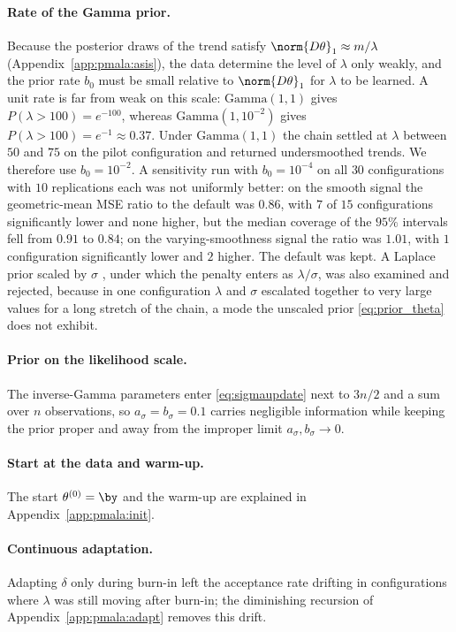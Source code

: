 \paragraph{Rate of the Gamma prior.} Because the posterior draws of the trend satisfy $\norm{D\theta}_1 \approx m/\lambda$ (Appendix~\ref{app:pmala:asis}), the data determine the level of $\lambda$ only weakly, and the prior rate $b_0$ must be small relative to $\norm{D\theta}_1$ for $\lambda$ to be learned. A unit rate is far from weak on this scale: $\mathrm{Gamma}(1,1)$ gives $P(\lambda > 100) = e^{-100}$, whereas $\mathrm{Gamma}(1, 10^{-2})$ gives $P(\lambda > 100) = e^{-1} \approx 0.37$. Under $\mathrm{Gamma}(1,1)$ the chain settled at $\lambda$ between $50$ and $75$ on the pilot configuration and returned undersmoothed trends. We therefore use $b_0 = 10^{-2}$. A sensitivity run with $b_0 = 10^{-4}$ on all $30$ configurations with $10$ replications each was not uniformly better: on the smooth signal the geometric-mean MSE ratio to the default was $0.86$, with $7$ of $15$ configurations significantly lower and none higher, but the median coverage of the $95\%$ intervals fell from $0.91$ to $0.84$; on the varying-smoothness signal the ratio was $1.01$, with $1$ configuration significantly lower and $2$ higher. The default was kept. A Laplace prior scaled by $\sigma$ \citep{park2008bayesian}, under which the penalty enters as $\lambda/\sigma$, was also examined and rejected, because in one configuration $\lambda$ and $\sigma$ escalated together to very large values for a long stretch of the chain, a mode the unscaled prior \eqref{eq:prior_theta} does not exhibit.

\paragraph{Prior on the likelihood scale.} The inverse-Gamma parameters enter \eqref{eq:sigmaupdate} next to $3n/2$ and a sum over $n$ observations, so $a_\sigma = b_\sigma = 0.1$ carries negligible information while keeping the prior proper and away from the improper limit $a_\sigma, b_\sigma \to 0$.

\paragraph{Start at the data and warm-up.} The start $\theta^{(0)} = \by$ and the warm-up are explained in Appendix~\ref{app:pmala:init}.

\paragraph{Continuous adaptation.} Adapting $\delta$ only during burn-in left the acceptance rate drifting in configurations where $\lambda$ was still moving after burn-in; the diminishing recursion of Appendix~\ref{app:pmala:adapt} removes this drift.

